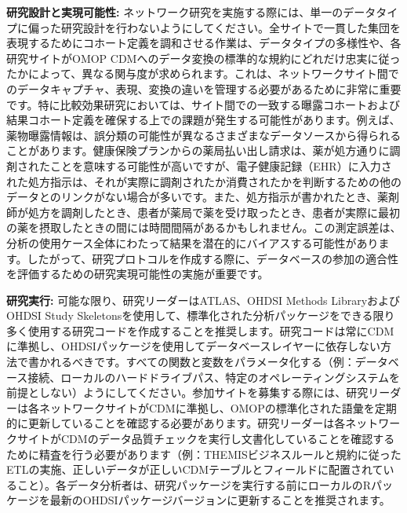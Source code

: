 \documentclass[
  11pt]{book}
\theoremstyle{definition}
\theoremstyle{definition}
\theoremstyle{definition}
\theoremstyle{definition}
\theoremstyle{remark}
\begin{document}
\textbf{研究設計と実現可能性:} ネットワーク研究を実施する際には、単一のデータタイプに偏った研究設計を行わないようにしてください。全サイトで一貫した集団を表現するためにコホート定義を調和させる作業は、データタイプの多様性や、各研究サイトがOMOP CDMへのデータ変換の標準的な規約にどれだけ忠実に従ったかによって、異なる関与度が求められます。これは、ネットワークサイト間でのデータキャプチャ、表現、変換の違いを管理する必要があるために非常に重要です。特に比較効果研究においては、サイト間での一致する曝露コホートおよび結果コホート定義を確保する上での課題が発生する可能性があります。例えば、薬物曝露情報は、誤分類の可能性が異なるさまざまなデータソースから得られることがあります。健康保険プランからの薬局払い出し請求は、薬が処方通りに調剤されたことを意味する可能性が高いですが、電子健康記録（EHR）に入力された処方指示は、それが実際に調剤されたか消費されたかを判断するための他のデータとのリンクがない場合が多いです。また、処方指示が書かれたとき、薬剤師が処方を調剤したとき、患者が薬局で薬を受け取ったとき、患者が実際に最初の薬を摂取したときの間には時間間隔があるかもしれません。この測定誤差は、分析の使用ケース全体にわたって結果を潜在的にバイアスする可能性があります。したがって、研究プロトコルを作成する際に、データベースの参加の適合性を評価するための研究実現可能性の実施が重要です。

\textbf{研究実行:} 可能な限り、研究リーダーはATLAS、OHDSI Methods LibraryおよびOHDSI Study Skeletonsを使用して、標準化された分析パッケージをできる限り多く使用する研究コードを作成することを推奨します。研究コードは常にCDMに準拠し、OHDSIパッケージを使用してデータベースレイヤーに依存しない方法で書かれるべきです。すべての関数と変数をパラメータ化する（例：データベース接続、ローカルのハードドライブパス、特定のオペレーティングシステムを前提としない）ようにしてください。参加サイトを募集する際には、研究リーダーは各ネットワークサイトがCDMに準拠し、OMOPの標準化された語彙を定期的に更新していることを確認する必要があります。研究リーダーは各ネットワークサイトがCDMのデータ品質チェックを実行し文書化していることを確認するために精査を行う必要があります（例：THEMISビジネスルールと規約に従ったETLの実施、正しいデータが正しいCDMテーブルとフィールドに配置されていること）。各データ分析者は、研究パッケージを実行する前にローカルのRパッケージを最新のOHDSIパッケージバージョンに更新することを推奨されます。
\end{document}
